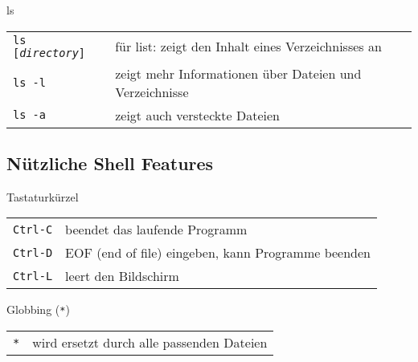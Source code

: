 \begin{frame}{ls}
  \begin{tabular}{lp{20em}}
    \texttt{ls [\textit{directory}]} & für list: zeigt den Inhalt eines Verzeichnisses an \\
    \texttt{ls -l} & zeigt mehr Informationen über Dateien und Verzeichnisse \\
    \texttt{ls -a} & zeigt auch versteckte Dateien
  \end{tabular}
\end{frame}

\subsection{Nützliche Shell Features}
\begin{frame}{Tastaturkürzel}
  \begin{tabular}{lp{20em}}
    \texttt{Ctrl-C} & beendet das laufende Programm \\
    \texttt{Ctrl-D} & EOF (end of file) eingeben, kann Programme beenden \\
    \texttt{Ctrl-L} & leert den Bildschirm
  \end{tabular}
\end{frame}

\begin{frame}{Globbing (\texttt{*})}
  \begin{tabular}{lp{20em}}
    \texttt{*} & wird ersetzt durch alle passenden Dateien
  \end{tabular}
\end{frame}
